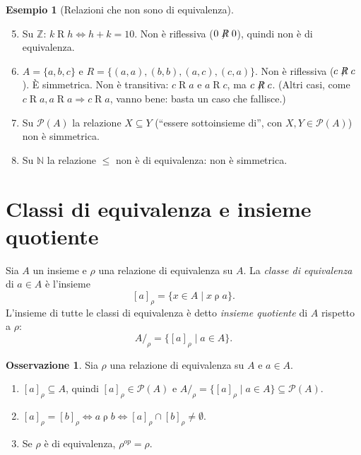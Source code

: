 \documentclass[11pt,a4paper]{article}
\theoremstyle{definition}
\newtheorem*{esempio}{Esempio}
\newtheorem*{osservazione}{Osservazione}
\begin{document}
\begin{esempio}[Relazioni che non sono di equivalenza]
\leavevmode
\begin{enumerate}
    \setcounter{enumi}{4}
    \item Su $\mathbb{Z}$: $k \mathrel{R} h \iff h + k = 10$. Non è
          riflessiva ($0 \not\mathrel{R} 0$), quindi non è di equivalenza.

    \item $A = \{a, b, c\}$ e $R = \{(a,a), (b,b), (a,c), (c,a)\}$.
          Non è riflessiva ($c \not\mathrel{R} c$). È simmetrica. Non è
          transitiva: $c \mathrel{R} a$ e $a \mathrel{R} c$, ma
          $c \not\mathrel{R} c$. (Altri casi, come
          $c \mathrel{R} a, a \mathrel{R} a \Rightarrow c \mathrel{R} a$,
          vanno bene: basta un caso che fallisce.)

    \item Su $\mathcal{P}(A)$ la relazione $X \subseteq Y$ (``essere
          sottoinsieme di'', con $X, Y \in \mathcal{P}(A)$) non è
          simmetrica.

    \item Su $\mathbb{N}$ la relazione $\leq$ non è di equivalenza: non è
          simmetrica.
\end{enumerate}
\end{esempio}

\section{Classi di equivalenza e insieme quotiente}

\begin{definizione}
Sia $A$ un insieme e $\rho$ una relazione di equivalenza su $A$. La
\emph{classe di equivalenza} di $a \in A$ è l'insieme
\[
[a]_\rho = \{x \in A \mid x \mathrel{\rho} a\}.
\]
L'insieme di tutte le classi di equivalenza è detto \emph{insieme
quotiente} di $A$ rispetto a $\rho$:
\[
A/_\rho = \{[a]_\rho \mid a \in A\}.
\]
\end{definizione}

\begin{osservazione}
Sia $\rho$ una relazione di equivalenza su $A$ e $a \in A$.
\begin{enumerate}
    \item $[a]_\rho \subseteq A$, quindi $[a]_\rho \in \mathcal{P}(A)$ e
          $A/_\rho = \{[a]_\rho \mid a \in A\} \subseteq \mathcal{P}(A)$.
    \item $[a]_\rho = [b]_\rho \iff a \mathrel{\rho} b \iff
          [a]_\rho \cap [b]_\rho \neq \emptyset$.
    \item Se $\rho$ è di equivalenza, $\rho^{op} = \rho$.
\end{enumerate}
\end{osservazione}
\end{document}

